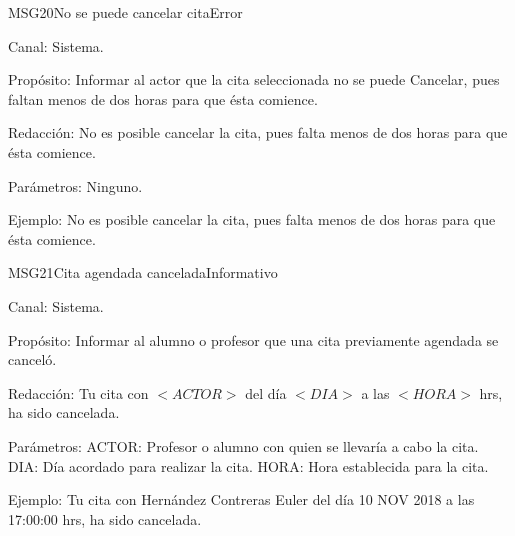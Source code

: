 \begin{mensaje}{MSG20}{No se puede cancelar cita}{Error}
	\item[Canal:] Sistema.
    \item[Propósito:] Informar al actor que la cita seleccionada no se puede Cancelar, pues faltan menos de dos horas para que ésta comience. 
    \item[Redacción:] No es posible cancelar la cita, pues falta menos de dos horas para que ésta comience.
    \item[Parámetros:] Ninguno.
    \item[Ejemplo:] No es posible cancelar la cita, pues falta menos de dos horas para que ésta comience.
\end{mensaje}

\begin{mensaje}{MSG21}{Cita agendada cancelada}{Informativo}
	\item[Canal:] Sistema.
    \item[Propósito:] Informar al alumno o profesor que una cita previamente agendada se canceló. 
    \item[Redacción:] Tu cita con $<ACTOR>$ del día $<DIA>$ a las $<HORA>$ hrs, ha sido cancelada. 
    \item[Parámetros:] ACTOR: Profesor o alumno con quien se llevaría a cabo la cita. DIA: Día acordado para realizar la cita. HORA: Hora establecida para la cita.
    \item[Ejemplo:] Tu cita con Hernández Contreras Euler del día 10 NOV 2018 a las 17:00:00 hrs, ha sido cancelada. 
\end{mensaje}

